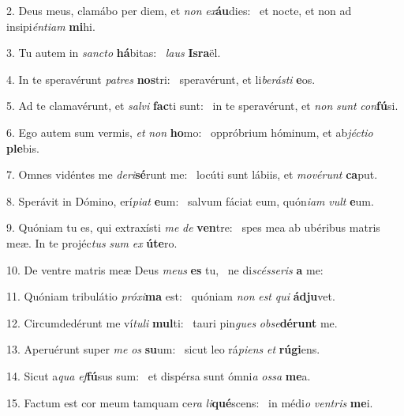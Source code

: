 2. Deus meus, clamábo per diem, et \textit{non} \textit{ex}\textbf{áu}dies: \ast\  et nocte, et non ad insipi\textit{én}\textit{ti}\textit{am} \textbf{mi}hi.\

3. Tu autem in \textit{sanc}\textit{to} \textbf{há}bitas: \ast\  \textit{laus} \textbf{Is}\textbf{ra}ël.\

4. In te speravérunt \textit{pa}\textit{tres} \textbf{nos}tri: \ast\  speravérunt, et li\textit{be}\textit{rás}\textit{ti} \textbf{e}os.\

5. Ad te clamavérunt, et \textit{sal}\textit{vi} \textbf{fac}ti sunt: \ast\  in te speravérunt, et \textit{non} \textit{sunt} \textit{con}\textbf{fú}si.\

6. Ego autem sum vermis, \textit{et} \textit{non} \textbf{ho}mo: \ast\  oppróbrium hóminum, et ab\textit{jéc}\textit{ti}\textit{o} \textbf{ple}bis.\

7. Omnes vidéntes me \textit{de}\textit{ri}\textbf{sé}runt me: \ast\  locúti sunt lábiis, et \textit{mo}\textit{vé}\textit{runt} \textbf{ca}put.\

8. Sperávit in Dómino, erí\textit{pi}\textit{at} \textbf{e}um: \ast\  salvum fáciat eum, quón\textit{i}\textit{am} \textit{vult} \textbf{e}um.\

9. Quóniam tu es, qui extraxísti \textit{me} \textit{de} \textbf{ven}tre: \ast\  spes mea ab ubéribus matris meæ. In te projéc\textit{tus} \textit{sum} \textit{ex} \textbf{ú}\textbf{te}ro.\

10. De ventre matris meæ Deus \textit{me}\textit{us} \textbf{es} tu, \ast\  ne di\textit{scés}\textit{se}\textit{ris} \textbf{a} me:\

11. Quóniam tribulátio \textit{pró}\textit{xi}\textbf{ma} est: \ast\  quóniam \textit{non} \textit{est} \textit{qui} \textbf{ád}\textbf{ju}vet.\

12. Circumdedérunt me ví\textit{tu}\textit{li} \textbf{mul}ti: \ast\  tauri pin\textit{gues} \textit{ob}\textit{se}\textbf{dé}\textbf{runt} me.\

13. Aperuérunt super \textit{me} \textit{os} \textbf{su}um: \ast\  sicut leo rá\textit{pi}\textit{ens} \textit{et} \textbf{rú}\textbf{gi}ens.\

14. Sicut a\textit{qua} \textit{ef}\textbf{fú}sus sum: \ast\  et dispérsa sunt ómni\textit{a} \textit{os}\textit{sa} \textbf{me}a.\

15. Factum est cor meum tamquam ce\textit{ra} \textit{li}\textbf{qué}scens: \ast\  in médi\textit{o} \textit{ven}\textit{tris} \textbf{me}i.\

